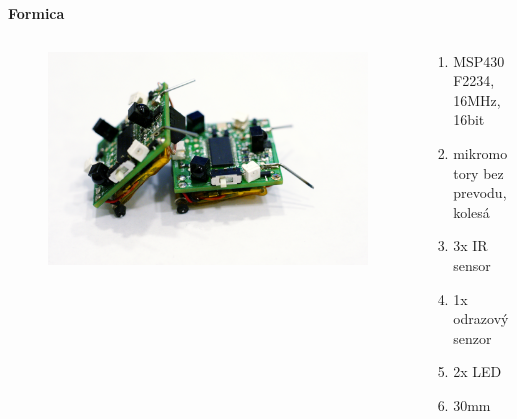 \documentclass[xcolor=dvipsnames]{beamer}
\begin{document}
\begin{frame}{\bf Formica}
\begin{columns}
	\begin{column}{0.48\textwidth}

	\begin{figure}[ht]
	\begin{center}
	\begin{minipage}{0.9\linewidth}
	\begin{center}
	\includegraphics[width=1.0\textwidth]{images/formica.jpg}
	\end{center}
	\end{minipage}
	\end{center}
	\end{figure}

	\end{column}
	\begin{column}{0.48\textwidth}
		\begin{enumerate}
			\item MSP430F2234, 16MHz, 16bit
            \item mikromotory bez prevodu, kolesá
			\item 3x IR sensor
            \item 1x odrazový senzor
            \item 2x LED
            \item 30mm
		\end{enumerate}
	\end{column}
\end{columns}

\end{frame}
\end{document}
